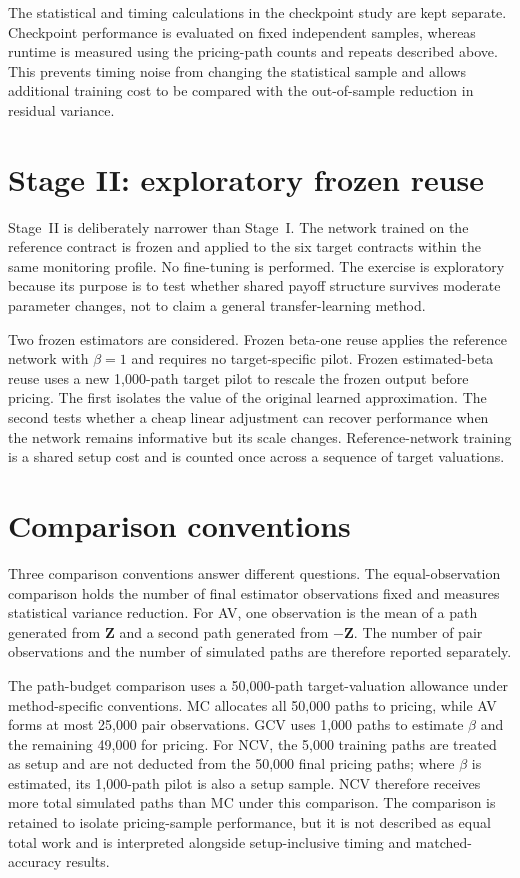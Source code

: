 The statistical and timing calculations in the checkpoint study are kept separate. Checkpoint performance is evaluated on fixed independent samples, whereas runtime is measured using the pricing-path counts and repeats described above. This prevents timing noise from changing the statistical sample and allows additional training cost to be compared with the out-of-sample reduction in residual variance.

\section{Stage II: exploratory frozen reuse}

Stage~II is deliberately narrower than Stage~I. The network trained on the reference contract is frozen and applied to the six target contracts within the same monitoring profile. No fine-tuning is performed. The exercise is exploratory because its purpose is to test whether shared payoff structure survives moderate parameter changes, not to claim a general transfer-learning method.

Two frozen estimators are considered. Frozen beta-one reuse applies the reference network with $\beta = 1$ and requires no target-specific pilot. Frozen estimated-beta reuse uses a new 1{,}000-path target pilot to rescale the frozen output before pricing. The first isolates the value of the original learned approximation. The second tests whether a cheap linear adjustment can recover performance when the network remains informative but its scale changes. Reference-network training is a shared setup cost and is counted once across a sequence of target valuations.

\section{Comparison conventions}

Three comparison conventions answer different questions. The equal-observation comparison holds the number of final estimator observations fixed and measures statistical variance reduction. For AV, one observation is the mean of a path generated from $\mathbf{Z}$ and a second path generated from $-\mathbf{Z}$. The number of pair observations and the number of simulated paths are therefore reported separately.

The path-budget comparison uses a 50{,}000-path target-valuation allowance under method-specific conventions. MC allocates all 50{,}000 paths to pricing, while AV forms at most 25{,}000 pair observations. GCV uses 1{,}000 paths to estimate $\beta$ and the remaining 49{,}000 for pricing. For NCV, the 5{,}000 training paths are treated as setup and are not deducted from the 50{,}000 final pricing paths; where $\beta$ is estimated, its 1{,}000-path pilot is also a setup sample. NCV therefore receives more total simulated paths than MC under this comparison. The comparison is retained to isolate pricing-sample performance, but it is not described as equal total work and is interpreted alongside setup-inclusive timing and matched-accuracy results.

